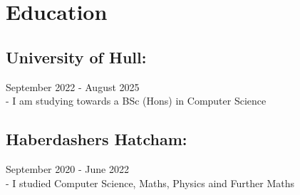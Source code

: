 \section{Education}

\subsection{University of Hull:} September 2022 - August 2025 \\
\:-\: I am studying towards a BSc (Hons) in Computer Science

\vspace{10pt}
\subsection{Haberdashers Hatcham:} September 2020 - June 2022 \\ 
\:-\: I studied Computer Science, Maths, Physics aind Further Maths 
